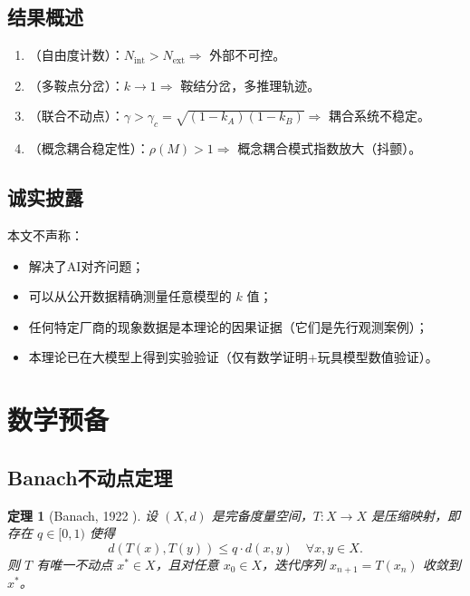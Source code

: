 \documentclass[12pt,a4paper]{article}
\newtheorem{theorem}{定理}[section]
\theoremstyle{definition}
\newcommand{\Nint}{N_{\mathrm{int}}}
\newcommand{\Next}{N_{\mathrm{ext}}}
\newcommand{\gamc}{\gamma_c}
\begin{document}
\subsection{结果概述}

\begin{enumerate}[leftmargin=*]
\item {}（自由度计数）：$\Nint > \Next \Rightarrow$ 外部不可控。
\item {}（多鞍点分岔）：$k \to 1 \Rightarrow$ 鞍结分岔，多推理轨迹。
\item {}（联合不动点）：$\gamma > \gamc = \sqrt{(1-k_A)(1-k_B)} \Rightarrow$ 耦合系统不稳定。
\item {}（概念耦合稳定性）：$\rho(M) > 1 \Rightarrow$ 概念耦合模式指数放大（抖颤）。
\end{enumerate}

\subsection{诚实披露}

本文不声称：
\begin{itemize}[leftmargin=*]
\item 解决了AI对齐问题；
\item 可以从公开数据精确测量任意模型的 $k$ 值；
\item 任何特定厂商的现象数据是本理论的因果证据（它们是先行观测案例）；
\item 本理论已在大模型上得到实验验证（仅有数学证明+玩具模型数值验证）。
\end{itemize}

\section{数学预备}
\label{sec:prelim}

\subsection{Banach不动点定理}

\begin{theorem}[Banach, 1922 {\cite{Banach1922}}]
\label{thm:banach}
设 $(X, d)$ 是完备度量空间，$T: X \to X$ 是压缩映射，即存在 $q \in [0, 1)$ 使得
\[ d(T(x), T(y)) \leq q \cdot d(x, y) \quad \forall x, y \in X. \]
则 $T$ 有唯一不动点 $x^* \in X$，且对任意 $x_0 \in X$，迭代序列 $x_{n+1} = T(x_n)$ 收敛到 $x^*$。
\end{theorem}
\end{document}
